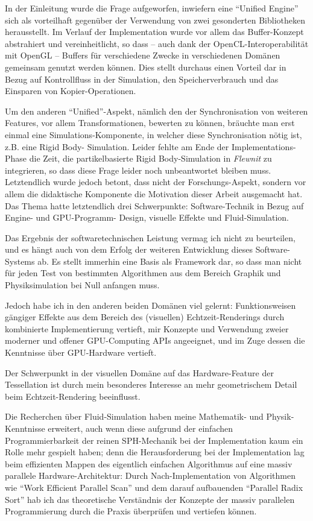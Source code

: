 
\label{sec:Fazit}

In der Einleitung wurde die Frage aufgeworfen, inwiefern eine "`Unified Engine"' sich als vorteilhaft
gegenüber der Verwendung von zwei gesonderten Bibliotheken herausstellt.
Im Verlauf der Implementation wurde vor allem das Buffer-Konzept abstrahiert und vereinheitlicht,
so dass -- auch dank der OpenCL-Interoperabilität mit OpenGL -- Buffers für verschiedene Zwecke
in verschiedenen Domänen gemeinsam genutzt werden können. Dies stellt durchaus einen Vorteil dar
in Bezug auf Kontrollfluss in der Simulation, den Speicherverbrauch und das Einsparen von Kopier-Operationen.

Um den anderen "`Unified"'-Aspekt, nämlich den der Synchronisation von weiteren Features, vor allem
Transformationen, bewerten zu können, bräuchte man erst einmal eine Simulations-Komponente, 
in welcher diese Synchronisation nötig ist, z.B. eine Rigid Body- Simulation.
Leider fehlte am Ende der Implementations-Phase die Zeit, die partikelbasierte Rigid Body-Simulation 
in \emph{Flewnit} zu integrieren, so dass diese Frage leider noch unbeantwortet bleiben muss.\\

Letztendlich wurde jedoch betont, dass nicht der Forschungs-Aspekt, sondern vor allem die didaktische Komponente
die Motivation dieser Arbeit ausgemacht hat. Das Thema hatte letztendlich drei Schwerpunkte: 
Software-Technik in Bezug auf Engine- und GPU-Programm- Design, visuelle Effekte und Fluid-Simulation.

Das Ergebnis der softwaretechnischen Leistung vermag ich nicht zu beurteilen, und es hängt auch von dem
Erfolg der weiteren Entwicklung dieses Software-Systems ab. Es stellt immerhin eine Basis als Framework dar, 
so dass man nicht für jeden Test von bestimmten Algorithmen aus dem Bereich Graphik und Physiksimulation 
bei Null anfangen muss.

Jedoch habe ich in den anderen beiden Domänen viel gelernt:
Funktionsweisen gängiger Effekte aus dem Bereich des (visuellen) Echtzeit-Renderings durch kombinierte Implementierung vertieft, mir Konzepte und Verwendung zweier moderner und offener GPU-Computing APIs angeeignet, und im
Zuge dessen die Kenntnisse über GPU-Hardware vertieft.

Der Schwerpunkt in der visuellen Domäne auf das Hardware-Feature der Tessellation ist durch mein besonderes
Interesse an mehr geometrischem Detail beim Echtzeit-Rendering beeinflusst.

Die Recherchen über Fluid-Simulation haben meine Mathematik- und Physik-Kenntnisse erweitert, auch wenn diese
aufgrund der einfachen Programmierbarkeit der reinen SPH-Mechanik bei der Implementation kaum ein Rolle mehr gespielt haben; denn die Herausforderung bei der Implementation lag beim effizienten Mappen des eigentlich einfachen 
Algorithmus auf eine massiv parallele Hardware-Architektur: Durch Nach-Implementation von Algorithmen wie "`Work Efficient Parallel Scan"' und dem darauf aufbauenden "`Parallel Radix Sort"' hab ich das theoretische Verständnis 
der Konzepte der massiv parallelen Programmierung durch die Praxis überprüfen und vertiefen können.\\

